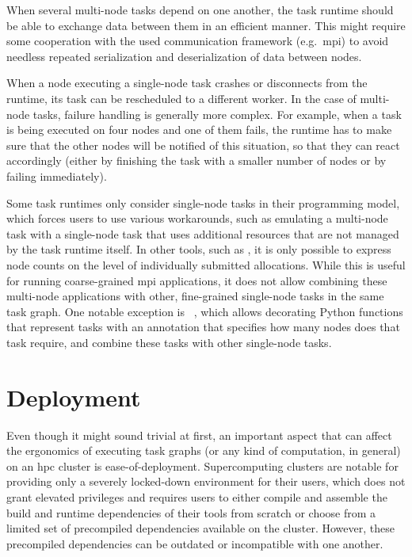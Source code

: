 \begin{description}[wide=0pt]
		When several multi-node tasks depend on one another, the task runtime should be able to exchange
		data between them in an efficient manner. This might require some cooperation with the used
		communication framework (e.g.\ \gls{mpi}) to avoid needless repeated serialization and
		deserialization of data between nodes.
	\item[Fault tolerance] When a node executing a single-node task crashes or disconnects from the runtime, its task can be
		rescheduled to a different worker. In the case of multi-node tasks, failure handling is generally
		more complex. For example, when a task is being executed on four nodes and one of them fails, the
		runtime has to make sure that the other nodes will be notified of this situation, so that they can
		react accordingly (either by finishing the task with a smaller number of nodes or by failing
		immediately).
\end{description}

Some task runtimes only consider single-node tasks in their programming model, which forces users
to use various workarounds, such as emulating a multi-node task with a single-node task that uses
additional resources that are not managed by the task runtime itself. In other tools, such as
\autosubmit{}, it is only possible to express node counts on the level of individually
submitted allocations. While this is useful for running coarse-grained \gls{mpi}
applications, it does not allow combining these multi-node applications with other, fine-grained
single-node tasks in the same task graph. One notable exception is
\pycompss{}~\cite{pycompss}, which allows decorating Python functions that
represent tasks with an annotation that specifies how many nodes does that task require, and
combine these tasks with other single-node tasks.


\section{Deployment}
\label{challenge:deployment}
Even though it might sound trivial at first, an important aspect that can affect the ergonomics of
executing task graphs (or any kind of computation, in general) on an \gls{hpc}
cluster is ease-of-deployment. Supercomputing clusters are notable for providing only a severely
locked-down environment for their users, which does not grant elevated privileges and requires
users to either compile and assemble the build and runtime dependencies of their tools from scratch
or choose from a limited set of precompiled dependencies available on the cluster. However, these
precompiled dependencies can be outdated or incompatible with one another.

